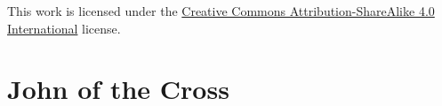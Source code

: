 

\frontmatter
\thispagestyle{empty}
\vspace*{\fill}
\clearpage

\thispagestyle{empty}
\vspace*{\fill}
\begin{center}
	{\footnotesize\noindent This work is licensed under the \href{https://creativecommons.org/licenses/by-sa/4.0/}{Creative Commons Attribution-ShareAlike 4.0 International} license.}\bigskip
\end{center}
\vspace*{2in}

\mainmatter
\chapter*{John of the Cross}
	

